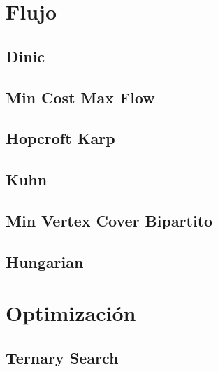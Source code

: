 \documentclass[a4paper,11pt,landscape,twocolumn]{article}
\begin{document}
\section{Flujo}

\subsection{Dinic}



\subsection{Min Cost Max Flow}



\subsection{Hopcroft Karp}



\subsection{Kuhn}



\subsection{Min Vertex Cover Bipartito}



\subsection{Hungarian}



\section{Optimización}

\subsection{Ternary Search}


\end{document}
